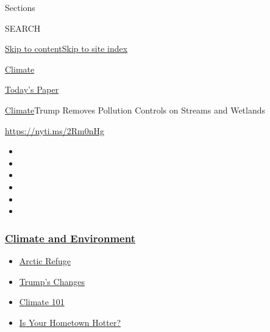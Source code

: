 Sections

SEARCH

\protect\hyperlink{site-content}{Skip to
content}\protect\hyperlink{site-index}{Skip to site index}

\href{https://www.nytimes3xbfgragh.onion/section/climate}{Climate}

\href{https://myaccount.nytimes3xbfgragh.onion/auth/login?response_type=cookie\&client_id=vi}{}

\href{https://www.nytimes3xbfgragh.onion/section/todayspaper}{Today's
Paper}

\href{/section/climate}{Climate}\textbar{}Trump Removes Pollution
Controls on Streams and Wetlands

\url{https://nyti.ms/2Rm0nHg}

\begin{itemize}
\item
\item
\item
\item
\item
\item
\end{itemize}

\hypertarget{climate-and-environment}{%
\subsubsection{\texorpdfstring{\href{https://www.nytimes3xbfgragh.onion/section/climate?name=styln-climate\&region=TOP_BANNER\&variant=undefined\&block=storyline_menu_recirc\&action=click\&pgtype=Article\&impression_id=07e69850-e390-11ea-ae4b-973c618b2df0}{Climate
and
Environment}}{Climate and Environment}}\label{climate-and-environment}}

\begin{itemize}
\tightlist
\item
  \href{https://www.nytimes3xbfgragh.onion/2020/08/17/climate/alaska-oil-drilling-anwr.html?name=styln-climate\&region=TOP_BANNER\&variant=undefined\&block=storyline_menu_recirc\&action=click\&pgtype=Article\&impression_id=07e69851-e390-11ea-ae4b-973c618b2df0}{Arctic
  Refuge}
\item
  \href{https://www.nytimes3xbfgragh.onion/interactive/2020/climate/trump-environment-rollbacks.html?name=styln-climate\&region=TOP_BANNER\&variant=undefined\&block=storyline_menu_recirc\&action=click\&pgtype=Article\&impression_id=07e69852-e390-11ea-ae4b-973c618b2df0}{Trump's
  Changes}
\item
  \href{https://www.nytimes3xbfgragh.onion/interactive/2020/04/19/climate/climate-crash-course-1.html?name=styln-climate\&region=TOP_BANNER\&variant=undefined\&block=storyline_menu_recirc\&action=click\&pgtype=Article\&impression_id=07e69853-e390-11ea-ae4b-973c618b2df0}{Climate
  101}
\item
  \href{https://www.nytimes3xbfgragh.onion/interactive/2018/08/30/climate/how-much-hotter-is-your-hometown.html?name=styln-climate\&region=TOP_BANNER\&variant=undefined\&block=storyline_menu_recirc\&action=click\&pgtype=Article\&impression_id=07e69854-e390-11ea-ae4b-973c618b2df0}{Is
  Your Hometown Hotter?}
\end{itemize}

